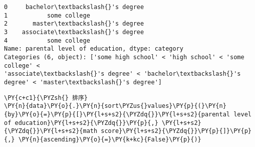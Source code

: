             \begin{tcolorbox}[breakable, size=fbox, boxrule=.5pt, pad at break*=1mm, opacityfill=0]
\begin{Verbatim}[commandchars=\\\{\}]
0     bachelor\textbackslash{}'s degree
1           some college
2       master\textbackslash{}'s degree
3    associate\textbackslash{}'s degree
4           some college
Name: parental level of education, dtype: category
Categories (6, object): ['some high school' < 'high school' < 'some college' <
'associate\textbackslash{}'s degree' < 'bachelor\textbackslash{}'s degree' < 'master\textbackslash{}'s degree']
\end{Verbatim}
\end{tcolorbox}
        
    \begin{tcolorbox}[breakable, size=fbox, boxrule=1pt, pad at break*=1mm,colback=cellbackground, colframe=cellborder]
\begin{Verbatim}[commandchars=\\\{\}]
\PY{c+c1}{\PYZsh{} 排序}
\PY{n}{data}\PY{o}{.}\PY{n}{sort\PYZus{}values}\PY{p}{(}\PY{n}{by}\PY{o}{=}\PY{p}{[}\PY{l+s+s2}{\PYZdq{}}\PY{l+s+s2}{parental level of education}\PY{l+s+s2}{\PYZdq{}}\PY{p}{,} \PY{l+s+s2}{\PYZdq{}}\PY{l+s+s2}{math score}\PY{l+s+s2}{\PYZdq{}}\PY{p}{]}\PY{p}{,} \PY{n}{ascending}\PY{o}{=}\PY{k+kc}{False}\PY{p}{)}
\end{Verbatim}
\end{tcolorbox}

